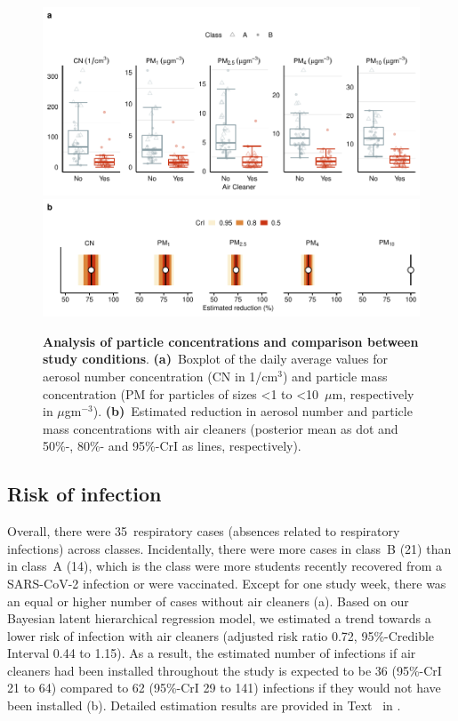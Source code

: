 \documentclass[fleqn,11pt]{wlscirep}
\begin{document}
\begin{figure}[!htpb]
\centering
    \includegraphics[width=\linewidth]{../../results/env-data/particles-boxplot.pdf}
    \includegraphics[width=\linewidth]{../../results/env-data/estimation-results-figure.pdf}
    \caption{\textbf{Analysis of particle concentrations and comparison between study conditions}. \textbf{(a)}~Boxplot of the daily average values for aerosol number concentration (CN in 1/cm$^3$) and particle mass concentration (PM for particles of sizes <1 to <10~$\mu$m, respectively in $\mu$gm$^{-3}$). \textbf{(b)}~Estimated reduction in aerosol number and particle mass concentrations with air cleaners (posterior mean as dot and 50\%-, 80\%- and 95\%-CrI as lines, respectively). }
    \label{fig:palas-results}
\end{figure}

\subsection{Risk of infection}

Overall, there were 35~respiratory cases (absences related to respiratory infections) across classes. Incidentally, there were more cases in class~B (21) than in class~A (14), which is the class were more students recently recovered from a SARS-CoV-2 infection or were vaccinated. Except for one study week, there was an equal or higher number of cases without air cleaners (a). Based on our Bayesian latent hierarchical regression model, we estimated a trend towards a lower risk of infection with air cleaners (adjusted risk ratio 0.72, 95\%-Credible Interval 0.44 to 1.15). As a result, the estimated number of infections if air cleaners had been installed throughout the study is expected to be 36 (95\%-CrI 21 to 64) compared to 62 (95\%-CrI 29 to 141) infections if they would not have been installed (b). Detailed estimation results are provided in Text~ in \supp. 
\end{document}
